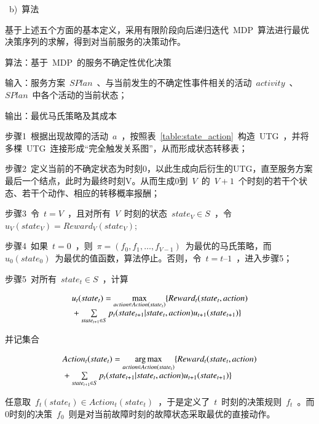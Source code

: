 ~b)~{算法}

基于上述五个方面的基本定义，采用有限阶段向后递归迭代~MDP~算法进行最优决策序列的求解，得到对当前服务的决策动作。

算法：基于~MDP~的服务不确定性优化决策

输入：服务方案~$SPlan$~、与当前发生的不确定性事件相关的活动~$activity$~、
~$SPlan$~中各个活动的当前状态；

输出：最优马氏策略及其成本

步骤1~根据出现故障的活动~$a$~，按照表~\ref{table:state_action}~构造~UTG~，并将多棵~UTG~连接形成“完全触发关系图”，从而形成状态转移表；

步骤2~定义当前的不确定状态为时刻0，以此生成向后衍生的UTG，直至服务方案最后一个结点，此时为最终时刻V。从而生成0到~$V$~的~$V+1$~个时刻的若干个状态、若干个动作、相应的转移概率报酬；

步骤3~令~$t=V$~，且对所有~$V$~时刻的状态~$state_V \in S$~，令~${u_V}( {state_V} ) = Reward_V( {state_V} )$;

步骤4~如果~$t=0$~，则~$\pi  = (f_0,f_1,\ldots ,f_{V-1})$~为最优的马氏策略，而~${u_0}( state_0)$~为最优的值函数，算法停止。否则，令~$t=t–1$~，进入步骤5；

步骤5~对所有~$state_t \in S$~，计算

\begin{equation}\label{equation:backward_mdp}
\begin{array}{l}
{u_t}(stat{e_t}) = \mathop {\max }\limits_{action \in Action(stat{e_t})} \{ Rewar{d_t}(stat{e_t},action)\\
{\rm{                        }} + \sum\limits_{stat{e_{t + 1}} \in S} {{p_t}(stat{e_{t + 1}}|stat{e_t},action){u_{t + 1}}(stat{e_{t + 1}})} \} 
\end{array}
\end{equation}

并记集合

\begin{equation}\label{equation:backward_mdp_arg}
\begin{array}{l}
Actio{n_t}(stat{e_t}) = \mathop {\arg \max }\limits_{action \in Action(stat{e_t})} \{ Rewar{d_t}(stat{e_t},action)\\
{\rm{                       }} + \sum\limits_{stat{e_{t + 1}} \in S} {{p_t}(stat{e_{t + 1}}|stat{e_t},action){u_{t + 1}}(stat{e_{t + 1}})} \} 
\end{array}
\end{equation}

任意取~$f_t(state_t) \in Action_t(state_t)$~，于是定义了~$t$~时刻的决策规则~$f_t$~。而0时刻的决策~$f_0$~则是对当前故障时刻的故障状态采取最优的直接动作。

